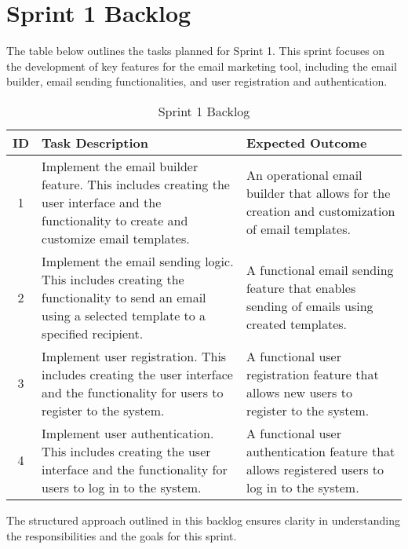 \section{Sprint 1 Backlog}

The table below outlines the tasks planned for Sprint 1. This sprint focuses on the development of key features for the email marketing tool, including the email builder, email sending functionalities, and user registration and authentication.

\begin{table}[ht]
	\centering
	\begin{tabularx}{\textwidth}{|c|X|X|}
		\hline
		\textbf{ID} & \textbf{Task Description}                                                                                                                        & \textbf{Expected Outcome}                                                                       \\
		\hline
		1           & Implement the email builder feature. This includes creating the user interface and the functionality to create and customize email templates.    & An operational email builder that allows for the creation and customization of email templates. \\
		\hline
		2           & Implement the email sending logic. This includes creating the functionality to send an email using a selected template to a specified recipient. & A functional email sending feature that enables sending of emails using created templates.      \\
		\hline
		3           & Implement user registration. This includes creating the user interface and the functionality for users to register to the system.                & A functional user registration feature that allows new users to register to the system.         \\
		\hline
		4           & Implement user authentication. This includes creating the user interface and the functionality for users to log in to the system.                & A functional user authentication feature that allows registered users to log in to the system.  \\
		\hline
	\end{tabularx}
	\caption{Sprint 1 Backlog}
	\label{tab:Sprint 1 Backlog}
\end{table}

The structured approach outlined in this backlog ensures clarity in understanding the responsibilities and the goals for this sprint.
